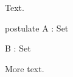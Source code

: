 \documentclass[acmsmall]{acmart}
\begin{document}
\thispagestyle{empty}

Text.
\begin{code}
  postulate
    A  : Set

    B  : Set
\end{code}
More text.
\end{document}

